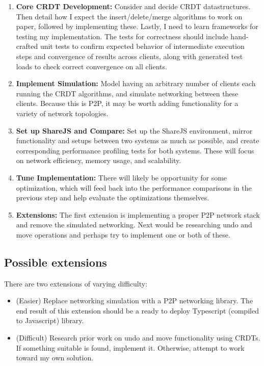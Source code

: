 \documentclass[12pt,a4paper,twoside]{article}
\begin{document}
\begin{enumerate}

\item \textbf{Core CRDT Development:} Consider and decide CRDT datastructures. Then detail how I expect
the insert/delete/merge algorithms to work on paper, followed by implementing these. Lastly, I need to
learn frameworks for testing my implementation. The tests for correctness should include hand-crafted unit tests
to confirm expected behavior of intermediate execution steps and convergence of results across clients, 
along with generated test loads to check correct convergence on all clients.


\item \textbf{Implement Simulation:} Model having an arbitrary number of clients each running the CRDT algorithms, and simulate
networking between these clients. Because this is P2P, it may be worth adding functionality for a variety of network
topologies.

\item \textbf{Set up ShareJS and Compare:} Set up the ShareJS environment, mirror functionality and setups 
between two systems as much as possible, and create corresponding performance profiling tests for both 
systems. These will focus on network efficiency, memory usage, and scalability.

\item \textbf{Tune Implementation:} There will likely be opportunity for some optimization, which will
feed back into the performance comparisons in the previous step and help evaluate the optimizations themselves.

\item \textbf{Extensions:} The first extension is implementing a proper P2P network stack and remove the simulated 
networking. Next would be researching undo and move operations and perhaps try to implement one or both of these.

\end{enumerate}



\subsection*{Possible extensions}

There are two extensions of varying difficulty:

\begin{itemize}

\item (Easier) Replace networking simulation with a P2P networking library. The end result of this extension should be a ready to deploy Typescript (compiled to Javascript) library.

\item (Difficult) Research prior work on undo and move functionality using CRDTs. If something suitable is found, implement it. Otherwise, attempt to work toward my own solution.

\end{itemize}
\end{document}
